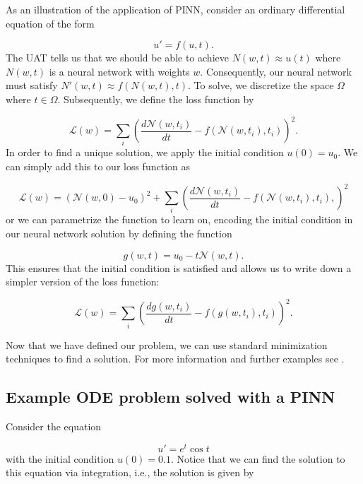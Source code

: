 \documentclass{CUP-JNL-DTM}%
\theoremstyle{definition}
\numberwithin{equation}{section}
\newcommand{\loss}{\mathcal{L}}
\newcommand{\net}{\mathcal{N}}
\begin{document}
As an illustration of the application of PINN, consider an ordinary differential equation of the form 

\begin{equation}
	u' = f(u,t). 
\end{equation}
The UAT tells us that we should be able to achieve $N(w,t) \approx u(t)$ where $N(w,t)$ is a neural network with weights $w$. Consequently, our neural network must satisfy $N'(w,t) \approx f(N(w,t), t)$. To solve, we discretize the space $\Omega$ where $t \in \Omega$. Subsequently, we define the loss function by 

\begin{equation}
	\loss(w) = \sum_i \left( \frac{d\net(w, t_i)}{dt} - f(\net(w,t_i), t_i)\right)^2. 
\end{equation}
In order to find a unique solution, we apply the initial condition $u(0) = u_0$. We can simply add this to our loss function as 

\begin{equation}
	\loss(w) = (\net(w,0) - u_0)^2 + \sum_i \left( \frac{d\net(w,t_i)}{dt} - f(\net(w,t_i), t_i),\right)^2
\end{equation}
or we can parametrize the function to learn on, encoding the initial condition in our neural network solution by defining the function 

\begin{equation}
	g(w,t) = u_0 - t\net(w,t).
\end{equation}
This ensures that the initial condition is satisfied and allows us to write down a simpler version of the loss function:

\begin{equation}
	\loss(w) = \sum_i \left(\frac{dg(w,t_i)}{dt} - f(g(w,t_i), t_i)\right)^2. 
\end{equation}

Now that we have defined our problem, we can use standard minimization techniques to find a solution. For more information and further examples see \cite{rackauckasSciMLSciMLBookParallel}. 

\subsection{Example ODE problem solved with a PINN}
	
Consider the equation

\begin{equation}
	u' = e^t \cos t
\end{equation}
with the initial condition $u(0) = 0.1$. Notice that we can find the solution to this equation via integration, i.e., the solution is given by
\end{document}
